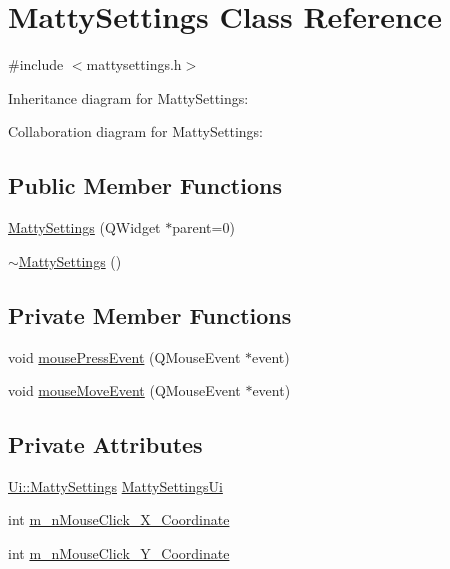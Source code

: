 \hypertarget{classMattySettings}{}\section{Matty\+Settings Class Reference}
\label{classMattySettings}


{\ttfamily \#include $<$mattysettings.\+h$>$}



Inheritance diagram for Matty\+Settings\+:


Collaboration diagram for Matty\+Settings\+:
\subsection*{Public Member Functions}
\begin{DoxyCompactItemize}
\item 
\hyperlink{classMattySettings_a0d5b0f74bacfcad4f084772a081294a9}{Matty\+Settings} (Q\+Widget $\ast$parent=0)
\item 
\hyperlink{classMattySettings_a361e58579542394627a34f07f408aa3a}{$\sim$\+Matty\+Settings} ()
\end{DoxyCompactItemize}
\subsection*{Private Member Functions}
\begin{DoxyCompactItemize}
\item 
void \hyperlink{classMattySettings_aedf4cc84f37e25a7704e1ced6c18df95}{mouse\+Press\+Event} (Q\+Mouse\+Event $\ast$event)
\item 
void \hyperlink{classMattySettings_a0d151b91e1d79229d6ae0addf858c0d8}{mouse\+Move\+Event} (Q\+Mouse\+Event $\ast$event)
\end{DoxyCompactItemize}
\subsection*{Private Attributes}
\begin{DoxyCompactItemize}
\item 
\hyperlink{classUi_1_1MattySettings}{Ui\+::\+Matty\+Settings} \hyperlink{classMattySettings_a6974b17b34c30385f6b503f40b460ea1}{Matty\+Settings\+Ui}
\item 
int \hyperlink{classMattySettings_aa1c8051298eee4d2e77a93af3ddeb9d0}{m\+\_\+n\+Mouse\+Click\+\_\+\+X\+\_\+\+Coordinate}
\item 
int \hyperlink{classMattySettings_a622b01c6b81a35e28b414079eaff132e}{m\+\_\+n\+Mouse\+Click\+\_\+\+Y\+\_\+\+Coordinate}
\end{DoxyCompactItemize}


